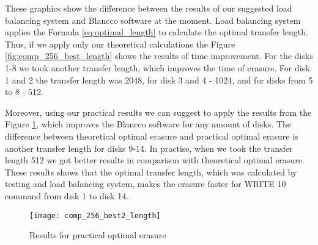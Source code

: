 These graphics show the difference between the results of our suggested load balancing system and Blancco software at the moment. Load balancing system applies the Formula \ref{eq:optimal_length} to calculate the optimal transfer length. Thus, if we apply only our theoretical calculations the Figure \ref{fig:comp_256_best_length} shows the results of time improvement.  For the disks 1-8 we took another transfer length, which improves the time of erasure. For disk 1 and 2 the transfer length was 2048, for disk 3 and 4 - 1024, and for disks from 5 to 8 - 512.


Moreover, using our practical results we can suggest to apply the results from the Figure \ref{fig:comp_256_best2_length}, which improves the Blancco software for any amount of disks. The difference between theoretical optimal erasure and practical optimal erasure is another transfer length for disks 9-14. In practise, when we took the transfer length 512 we got better results in comparison with theoretical optimal erasure. These results shows that the optimal transfer length, which was calculated by testing and load balancing system, makes the erasure faster for WRITE 10 command from disk 1 to disk 14.

\begin{figure}[h!]
\begin{center}
  \texttt{[image: comp\_256\_best2\_length]}
\end{center}
  \caption{Results for practical optimal erasure}
  \label{fig:comp_256_best2_length}
\end{figure}




